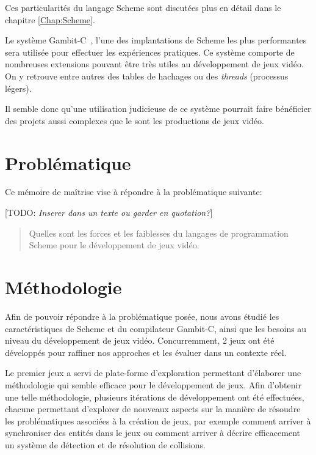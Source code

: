 \documentclass[12pt,oneside,letterpaper,francais]{book}
\newcommand{\todo}[1]{[TODO: {\it #1}]}
\begin{document}
Ces particularités du langage Scheme sont discutées plus en détail
dans le chapitre \ref{Chap:Scheme}.

Le système Gambit-C~\cite{Gambit4}, l'une des implantations de Scheme
les plus performantes~\cite{GAMBIT_BENCHMARKS} sera utilisée pour
effectuer les expériences pratiques. Ce système comporte de nombreuses
extensions pouvant être très utiles au développement de jeux vidéo. On
y retrouve entre autres des tables de hachages ou des \textit{threads}
(processus légers).

Il semble donc qu'une utilisation judicieuse de ce système pourrait
faire bénéficier des projets aussi complexes que le sont les
productions de jeux vidéo.

\section{Problématique}
Ce mémoire de maîtrise vise à répondre à la problématique suivante:

\todo{Inserer dans un texte ou garder en quotation?}

\begin{quote}
  Quelles sont les forces et les faiblesses du langages de
  programmation Scheme pour le développement de jeux vidéo.
\end{quote}

\section{Méthodologie}



Afin de pouvoir répondre à la problématique posée, nous avons étudié
les caractéristiques de Scheme et du compilateur Gambit-C, ainsi que
les besoins au niveau du développement de jeux vidéo. Concurremment, 2
jeux ont été développés pour raffiner nos approches et les évaluer
dans un contexte réel.

Le premier jeux a servi de plate-forme d'exploration permettant
d'élaborer une méthodologie qui semble efficace pour le développement
de jeux. Afin d'obtenir une telle méthodologie, plusieurs itérations
de développement ont été effectuées, chacune permettant d'explorer de
nouveaux aspects sur la manière de résoudre les problématiques
associées à la création de jeux, par exemple comment arriver à
synchroniser des entités dans le jeux ou comment arriver à décrire
efficacement un système de détection et de résolution de collisions.
\end{document}
